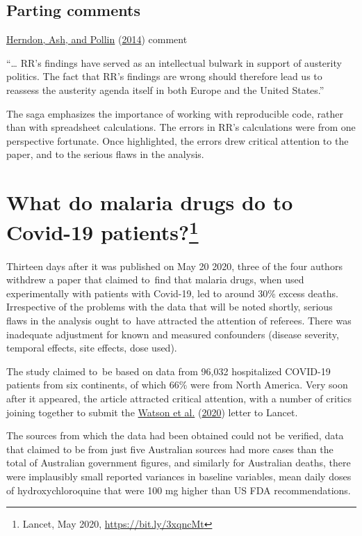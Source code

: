 \documentclass[
  10pt,
  b5paper]{book}
\begin{document}
\hypertarget{parting-comments}{%
\subsection*{Parting comments}\label{parting-comments}}

\protect\hyperlink{ref-herndon2014does}{Herndon, Ash, and Pollin} (\protect\hyperlink{ref-herndon2014does}{2014}) comment

``\ldots{} RR's findings have served as an intellectual bulwark in support of austerity politics. The fact that RR's findings are wrong should therefore lead us to reassess the austerity agenda itself in both Europe and the United States.''

The saga emphasizes the importance of working with reproducible code,
rather than with spreadsheet calculations.
The errors in RR's calculations were from one perspective fortunate.
Once highlighted, the errors drew critical attention to the paper,
and to the serious flaws in the analysis.

\hypertarget{sec:lancet}{%
\section[What do malaria drugs do to Covid-19 patients?]{\texorpdfstring{What do malaria drugs do to Covid-19 patients?\footnote{Lancet, May 2020, \url{https://bit.ly/3xqncMt}}}{What do malaria drugs do to Covid-19 patients?}}\label{sec:lancet}}

Thirteen days after it was published on May 20 2020, three of the
four authors withdrew a paper that claimed to~find that malaria drugs,
when used experimentally with patients with Covid-19, led to around
30\% excess deaths. Irrespective of the problems with the data that
will be noted shortly, serious flaws in the analysis ought to~have
attracted the attention of referees. There was inadequate
adjustment for known and measured confounders (disease severity,
temporal effects, site effects, dose used).

The study claimed to~be based on data from 96,032
hospitalized COVID-19 patients from six continents, of which 66\%
were from North America. Very soon after it appeared, the article
attracted critical attention, with a number of critics joining
together to submit the \protect\hyperlink{ref-watson2020open}{Watson et al.} (\protect\hyperlink{ref-watson2020open}{2020}) letter to Lancet.

The sources from which the data had been obtained could not be verified,
data that claimed to be from just five Australian sources had more
cases than the total of Australian government figures, and similarly
for Australian deaths, there were implausibly small reported variances
in baseline variables, mean daily doses of hydroxychloroquine that were
100 mg higher than US FDA recommendations.
\end{document}
